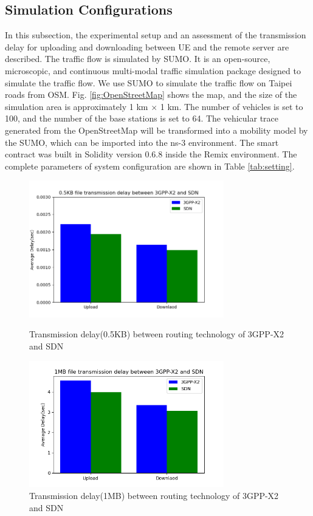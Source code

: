 \documentclass[journal]{IEEEtran}
\begin{document}
    \subsection{Simulation Configurations}
    
    In this subsection, the experimental setup and an assessment of the transmission delay for uploading and downloading between UE and the remote server are described. The traffic flow is simulated by SUMO. It is an open-source, microscopic, and continuous multi-modal traffic simulation package designed to simulate the traffic flow. We use SUMO to simulate the traffic flow on Taipei roads from OSM. Fig. \ref{fig:OpenStreetMap} shows the map, and the size of the simulation area is approximately 1 km $\times$ 1 km. The number of vehicles is set to 100, and the number of the base stations is set to 64. The vehicular trace generated from the OpenStreetMap will be transformed into a mobility model by the SUMO, which can be imported into the ns-3 environment. The smart contract was built in Solidity version 0.6.8 inside the Remix environment. The complete parameters of system configuration are shown in Table \ref{tab:setting}. 

\begin{figure}
    \centering
    \includegraphics[width=240pt]{picture/0.5KB.png}
    \caption{Transmission delay(0.5KB) between routing technology of 3GPP-X2 and SDN}
    \label{fig:x2}
    
    \centering
    \includegraphics[width=240pt]{picture/1MB.png}
    \caption{Transmission delay(1MB) between routing technology of 3GPP-X2 and SDN}
    \label{fig:sdn}
\end{figure}
\end{document}

